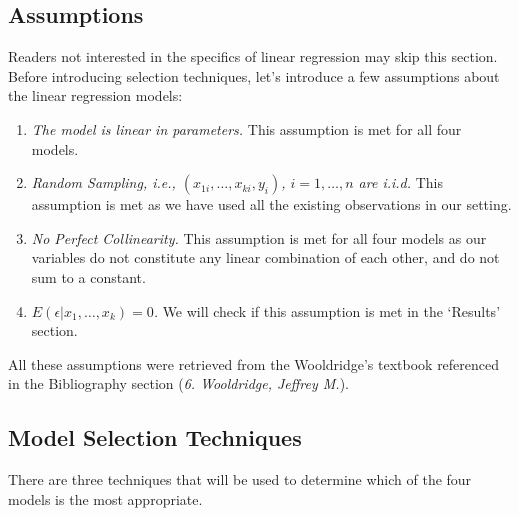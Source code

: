 \documentclass[
]{article}
\begin{document}
\hypertarget{assumptions}{%
\subsection{Assumptions}\label{assumptions}}

Readers not interested in the specifics of linear regression may skip
this section. Before introducing selection techniques, let's introduce a
few assumptions about the linear regression models:

\begin{enumerate}
\def\labelenumi{\arabic{enumi}.}
\item
  \emph{The model is linear in parameters.} This assumption is met for
  all four models.
\item
  \emph{Random Sampling, i.e., \((x_{1i},…,x_{ki},y_i)\), \(i =1,…,n\)
  are i.i.d.} This assumption is met as we have used all the existing
  observations in our setting.
\item
  \emph{No Perfect Collinearity.} This assumption is met for all four
  models as our variables do not constitute any linear combination of
  each other, and do not sum to a constant.
\item
  \emph{\(E(\epsilon| x_1,…, x_k) = 0\).} We will check if this
  assumption is met in the `Results' section.
\end{enumerate}

All these assumptions were retrieved from the Wooldridge's textbook
referenced in the Bibliography section (\emph{6. Wooldridge, Jeffrey
M.}).

\hypertarget{model-selection-techniques}{%
\subsection{Model Selection
Techniques}\label{model-selection-techniques}}

There are three techniques that will be used to determine which of the
four models is the most appropriate.
\end{document}
